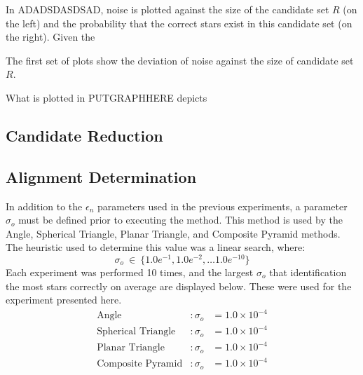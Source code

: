 In ADADSDASDSAD, noise is plotted against the size of the candidate set $R$ (on the left) and the probability that the
correct stars exist in this candidate set (on the right).
Given the

The first set of plots show the deviation of noise against the size of candidate set $R$.

What is plotted in PUTGRAPHHERE depicts

\subsection{Candidate Reduction}\label{subsec:candidateReductionAnalysis}


\subsection{Alignment Determination}\label{subsec:alignmentDeterminationAnalysis}
In addition to the $\epsilon_n$ parameters used in the previous experiments, a parameter $\sigma_o$ must be defined
prior to executing the  method.
This method is used by the Angle, Spherical Triangle, Planar Triangle, and Composite Pyramid methods.
The heuristic used to determine this value was a linear search, where:
\begin{equation}
    \label{eq:gridSearchSigma}
    \sigma_o \ \in \ \{1.0e^{-1}, 1.0e^{-2}, \ldots 1.0e^{-10}\}
\end{equation}
Each experiment was performed 10 times, and the largest $\sigma_o$ that identification the most stars correctly on
average are displayed below.
These were used for the experiment presented here.
\begin{align*}
    \text{Angle}&: \sigma_o &= 1.0 \times 10^{-4}\\
    \text{Spherical Triangle}&: \sigma_o &= 1.0 \times 10^{-4}\\
    \text{Planar Triangle}&: \sigma_o &= 1.0 \times 10^{-4}\\
    \text{Composite Pyramid}&: \sigma_o &= 1.0 \times 10^{-4}\\
\end{align*}
